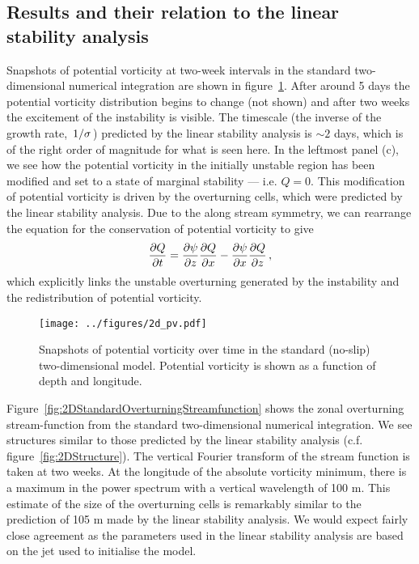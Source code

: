 \subsection{Results and their relation to the linear stability analysis}
Snapshots of potential vorticity at two-week intervals in the standard two-dimensional numerical integration are shown in figure~\ref{fig:2DPVSnapshotsStandard}. After around 5 days the potential vorticity distribution begins to change (not shown) and after two weeks the excitement of the instability is visible. The timescale (the inverse of the growth rate, $\flatfrac{1}{\sigma}$) predicted by the linear stability analysis is $\sim 2$ days, which is of the right order of magnitude for what is seen here. In the leftmost panel (c), we see how the potential vorticity in the initially unstable region has been modified and set to a state of marginal stability --- i.e. $Q = 0$. This modification of potential vorticity is driven by the overturning cells, which were predicted by the linear stability analysis. Due to the along stream symmetry, we can rearrange the equation for the conservation of potential vorticity to give
\begin{equation}
    \label{eq:PVEvolution}
    \pdv{Q}{t} = \pdv{\psi}{z}\pdv{Q}{x} - \pdv{\psi}{x}\pdv{Q}{z} \, ,%
\end{equation}
which explicitly links the unstable overturning generated by the instability and the redistribution of potential vorticity\footnotemark.

\begin{figure}
    \centering
    \texttt{[image: ../figures/2d\_pv.pdf]}
    \caption{Snapshots of potential vorticity over time in the standard (no-slip) two-dimensional model. Potential vorticity is shown as a function of depth and longitude.}
    \label{fig:2DPVSnapshotsStandard}
\end{figure}

Figure~\ref{fig:2DStandardOverturningStreamfunction} shows the zonal overturning stream-function from the standard two-dimensional numerical integration. We see structures similar to those predicted by the linear stability analysis (c.f. figure~\ref{fig:2DStructure}). The vertical Fourier transform of the stream function is taken at two weeks. At the longitude of the absolute vorticity minimum, there is a maximum in the power spectrum with a vertical wavelength of 100 m. This estimate of the size of the overturning cells is remarkably similar to the prediction of 105 m made by the linear stability analysis. We would expect fairly close agreement as the parameters used in the linear stability analysis are based on the jet used to initialise the model.

